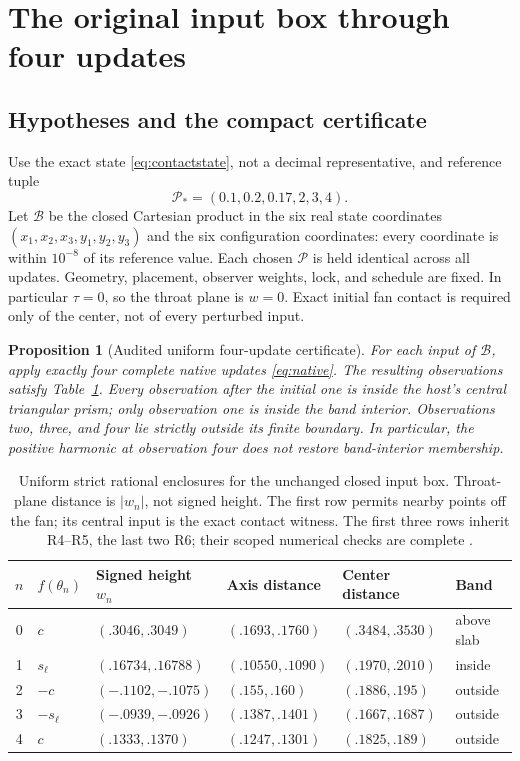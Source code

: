\documentclass[11pt,a4paper]{article}
\numberwithin{equation}{section}
\newtheorem{proposition}[theorem]{Proposition}
\newcommand{\Params}{\mathcal P}
\newcommand{\boxinput}{\mathcal B}
\begin{document}
\section{The original input box through four updates}\label{sec:case}
\subsection{Hypotheses and the compact certificate}
Use the exact state \eqref{eq:contactstate}, not a decimal representative,
and reference tuple
\[
\Params_*=(0.1,0.2,0.17,2,3,4).
\]
Let $\boxinput$ be the closed Cartesian product in the six real state
coordinates $(x_1,x_2,x_3,y_1,y_2,y_3)$ and the six configuration coordinates:
every coordinate is within $10^{-8}$ of its reference value. Each chosen
$\Params$ is held identical across all updates. Geometry, placement, observer
weights, lock, and schedule are fixed. In particular $\tau=0$, so the
throat plane is $w=0$. Exact initial fan contact is required only of the
center, not of every perturbed input.

\begin{proposition}[Audited uniform four-update certificate]\label{prop:four}
For each input of $\boxinput$, apply exactly four complete native updates
\eqref{eq:native}. The resulting observations satisfy
Table~\ref{tab:observations}. Every observation after the initial one is inside
the host's central triangular prism; only observation one is inside the
band interior. Observations two, three, and four lie strictly outside its
finite boundary. In particular, the positive harmonic at observation four
does not restore band-interior membership.
\end{proposition}

\begin{table}[htbp]
\centering\small
\begin{tabular}{@{}clllll@{}}
\toprule
$n$ & $f(\theta_n)$ & Signed height $w_n$ & Axis distance & Center distance &
Band\\ \midrule
0 &$c$&$(.3046,.3049)$&$(.1693,.1760)$&$(.3484,.3530)$&above slab\\
1 &$s_\ell$&$(.16734,.16788)$&$(.10550,.1090)$&$(.1970,.2010)$&inside\\
2 &$-c$&$(-.1102,-.1075)$&$(.155,.160)$&$(.1886,.195)$&outside\\
3 &$-s_\ell$&$(-.0939,-.0926)$&$(.1387,.1401)$&$(.1667,.1687)$&outside\\
4 &$c$&$(.1333,.1370)$&$(.1247,.1301)$&$(.1825,.189)$&outside\\
\bottomrule
\end{tabular}
\caption{Uniform strict rational enclosures for the unchanged closed input
box. Throat-plane distance is $|w_n|$, not signed height. The first row
permits nearby points off the fan; its central input is the exact contact
witness. The first three rows inherit R4--R5, the last two R6; their scoped numerical checks are complete \cite{Audit,GPTAudit}.}
\label{tab:observations}
\end{table}
\end{document}
